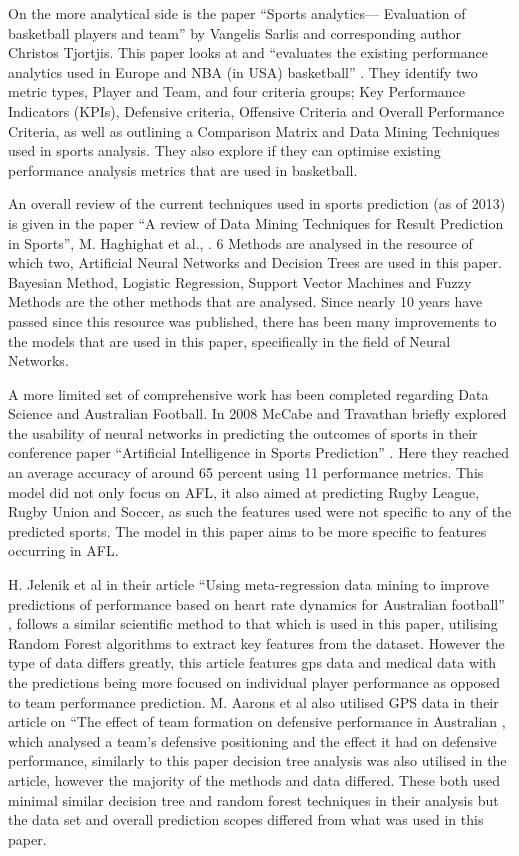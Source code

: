 \documentclass{imc-inf}
\begin{document}
	On the more analytical side is the paper “Sports analytics— Evaluation of basketball players and team” by Vangelis Sarlis and corresponding author Christos Tjortjis. This paper looks at and “evaluates the existing performance analytics used in Europe and NBA (in USA) basketball” \cite{Basketball}. They identify two metric types, Player and Team, and four criteria groups; Key Performance Indicators (KPIs), Defensive criteria, Offensive Criteria and Overall Performance Criteria, as well as outlining a Comparison Matrix and Data Mining Techniques used in sports analysis. They also explore if they can optimise existing performance analysis metrics that are used in basketball. 
	
	An overall review of the current techniques used in sports prediction (as of 2013) is given in the paper “A review of Data Mining Techniques for Result Prediction in Sports”, M. Haghighat et al., \cite{ResearchGate}. 6 Methods are analysed in the resource of which two, Artificial Neural Networks and Decision Trees are used in this paper. Bayesian Method, Logistic Regression, Support Vector Machines and Fuzzy Methods are the other methods that are analysed. Since nearly 10 years have passed since this resource was published, there has been many improvements to the models that are used in this paper, specifically in the field of Neural Networks. 
	
	A more limited set of comprehensive work has been completed regarding Data Science and Australian Football. In 2008 McCabe and Travathan briefly explored the usability of neural networks in predicting the outcomes of sports in their conference paper “Artificial Intelligence in Sports Prediction” \cite{AFL_1}. Here they reached an average accuracy of around 65 percent using 11 performance metrics. This model did not only focus on AFL, it also aimed at predicting Rugby League, Rugby Union and Soccer, as such the features used were not specific to any of the predicted sports. The model in this paper aims to be more specific to features occurring in AFL. 
	
	H. Jelenik et al in their article “Using meta-regression data mining to improve predictions of performance based on heart rate dynamics for Australian football” \cite{AFL_2}, follows a similar scientific method to that which is used in this paper, utilising Random Forest algorithms to extract key features from the dataset. However the type of data differs greatly, this article features gps data and medical data with the predictions being more focused on individual player performance as opposed to team performance prediction. M. Aarons et al also utilised GPS data in their article on “The effect of team formation on defensive performance in Australian \cite{AFL_3}, which analysed a team’s defensive positioning and the effect it had on defensive performance, similarly to this paper decision tree analysis was also utilised in the article, however the majority of the methods and data differed. These both used minimal similar decision tree and random forest techniques in their analysis but the data set and overall prediction scopes differed from what was used in this paper. 
	
\end{document}
